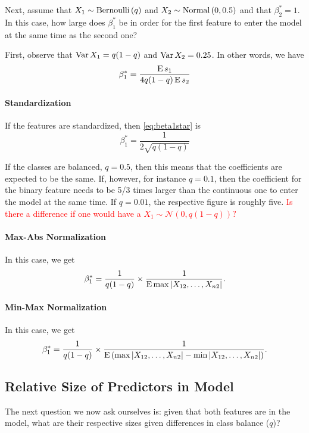 Next, assume that \(X_1 \sim \operatorname{Bernoulli}{(q)}\) and \(X_2 \sim \operatorname{Normal}{(0, 0.5)}\) and that \(\beta^*_2 = 1\). In this case, how large does \(\beta^*_1\) be in order for the first feature to enter the model at the same time as the second one?

First, observe that \(\operatorname{Var}{X_1} = q(1 - q)\) and \(\operatorname{Var}{X_2} = 0.25\). In other words, we have
\begin{equation}
  \label{eq:beta1star}
  \beta^*_1 = \frac{\operatorname{E} s_1}{4q(1-q)\operatorname{E} s_2}
\end{equation}

\paragraph{Standardization} If the features are standardized, then \eqref{eq:beta1star} is
\[
  \beta^*_1 = \frac{1}{2\sqrt{q(1-q)}}
\]

If the classes are balanced, \(q = 0.5\), then this means that the coefficients are expected to be the same. If, however, for instance \(q = 0.1\), then the coefficient for the binary feature needs to be 5/3 times larger than the continuous one to enter the model at the same time. If \(q=0.01\), the respective figure is roughly five. \textcolor{red}{Is there a difference if one would have a $X_1 \sim \mathcal{N}\left(0,q(1-q) \right)?$ }

\paragraph{Max-Abs Normalization} In this case, we get
\[
  \beta^*_1 = \frac{1}{q(1 - q)} \times \frac{1}{\operatorname{E} \max | X_{12}, \dots,  X_{n2} |}.
\]

\paragraph{Min-Max Normalization} In this case, we get
\[
  \beta^*_1 = \frac{1}{q(1 - q)} \times \frac{1}{\operatorname{E} \left(\max | X_{12}, \dots,  X_{n2}| - \min | X_{12}, \dots,  X_{n2} |\right)}.
\]

\subsection{Relative Size of Predictors in Model}

The next question we now ask ourselves is: given that both features are in the model, what are their respective sizes given differences in class balance (\(q\))?

